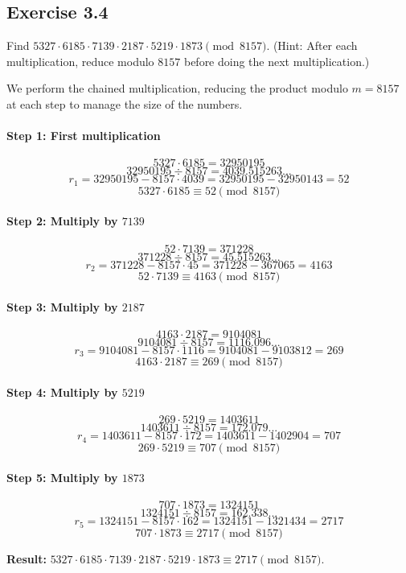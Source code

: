 \subsection*{Exercise 3.4}
Find $5327 \cdot 6185 \cdot 7139 \cdot 2187 \cdot 5219 \cdot 1873 \pmod{8157}$.
(Hint: After each multiplication, reduce modulo $8157$ before doing the next multiplication.)

\begin{solution}
We perform the chained multiplication, reducing the product modulo $m=8157$ at each step to manage the size of the numbers.

\paragraph{Step 1: First multiplication}
$$ 5327 \cdot 6185 = 32950195 $$
$$ 32950195 \div 8157 = 4039.515263... $$
$$ r_1 = 32950195 - 8157 \cdot 4039 = 32950195 - 32950143 = 52 $$
$$ 5327 \cdot 6185 \equiv 52 \pmod{8157} $$

\paragraph{Step 2: Multiply by $7139$}
$$ 52 \cdot 7139 = 371228 $$
$$ 371228 \div 8157 = 45.515263... $$
$$ r_2 = 371228 - 8157 \cdot 45 = 371228 - 367065 = 4163 $$
$$ 52 \cdot 7139 \equiv 4163 \pmod{8157} $$

\paragraph{Step 3: Multiply by $2187$}
$$ 4163 \cdot 2187 = 9104081 $$
$$ 9104081 \div 8157 = 1116.096... $$
$$ r_3 = 9104081 - 8157 \cdot 1116 = 9104081 - 9103812 = 269 $$
$$ 4163 \cdot 2187 \equiv 269 \pmod{8157} $$

\paragraph{Step 4: Multiply by $5219$}
$$ 269 \cdot 5219 = 1403611 $$
$$ 1403611 \div 8157 = 172.079... $$
$$ r_4 = 1403611 - 8157 \cdot 172 = 1403611 - 1402904 = 707 $$
$$ 269 \cdot 5219 \equiv 707 \pmod{8157} $$

\paragraph{Step 5: Multiply by $1873$}
$$ 707 \cdot 1873 = 1324151 $$
$$ 1324151 \div 8157 = 162.338... $$
$$ r_5 = 1324151 - 8157 \cdot 162 = 1324151 - 1321434 = 2717 $$
$$ 707 \cdot 1873 \equiv 2717 \pmod{8157} $$

\textbf{Result:} $5327 \cdot 6185 \cdot 7139 \cdot 2187 \cdot 5219 \cdot 1873 \equiv 2717 \pmod{8157}$.
\end{solution}
\newpage
